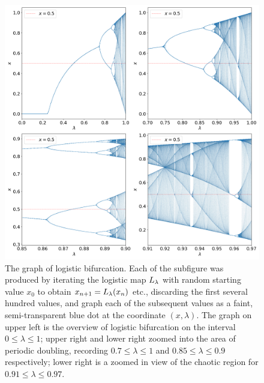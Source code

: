 \begin{figure}[htbp]
	\centering
	\includegraphics[width=\textwidth]{./figures/logistic.png}
	\caption{
		The graph of logistic bifurcation.
		Each of the subfigure was produced by iterating the logistic map $L_{\lambda}$ with random starting value $x_0$ to obtain $x_{n+1} = L_{\lambda}(x_n)$ etc., discarding the first several hundred values, and graph each of the subsequent values as a faint, semi-transparent blue dot at the coordinate $(x, \lambda)$.
		The graph on upper left is the overview of logistic bifurcation on the interval $0 \leq \lambda \leq 1$; upper right and lower right zoomed into the area of periodic doubling, recording $0.7 \leq \lambda \leq 1$ and $0.85 \leq \lambda \leq 0.9$ respectively; lower right is a zoomed in view of the chaotic region for $ 0.91 \leq \lambda \leq 0.97$. 
	}
	\label{fig:logistic bifurcation overview}
\end{figure}



